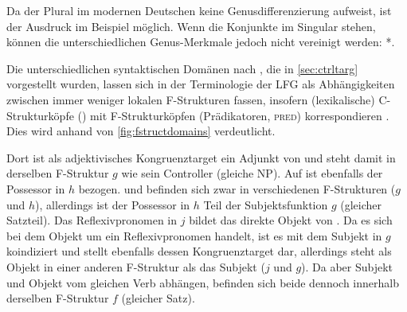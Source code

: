 Da der Plural im modernen Deutschen keine Genusdifferenzierung aufweist, ist
der Ausdruck im Beispiel möglich. Wenn die Konjunkte im Singular stehen, können
die unterschiedlichen Genus-Merkmale jedoch nicht vereinigt werden:
*.

Die unterschiedlichen syntaktischen Domänen nach \citet[54]{corbett2006}, die
in \cref{sec:ctrltarg} vorgestellt wurden, lassen sich in der Terminologie der
LFG als Abhängigkeiten zwischen immer weniger lokalen F-Strukturen fassen,
insofern (lexikalische) C-Strukturköpfe () mit F-Strukturköpfen
(Prädikatoren, \textsc{pred}) korrespondieren \autocite[117]{bresnanetal2016}.
Dies wird anhand von \cref{fig:fstructdomains} verdeutlicht.

Dort ist  als adjektivisches Kongruenztarget ein Adjunkt von
 und steht damit in derselben F-Struktur $g$ wie sein Controller
(gleiche NP). Auf  ist ebenfalls der Possessor  in $h$
bezogen.  und  befinden sich zwar in verschiedenen
F-Strukturen ($g$ und $h$), allerdings ist der Possessor in $h$ Teil der
Subjektsfunktion $g$ (gleicher Satzteil). Das Reflexivpronomen  in $j$
bildet das direkte Objekt von . Da es sich bei dem Objekt um ein
Reflexivpronomen handelt, ist es mit dem Subjekt in $g$ koindiziert und stellt
ebenfalls dessen Kongruenztarget dar, allerdings steht  als Objekt in
einer anderen F-Struktur als das Subjekt ($j$ und $g$). Da aber Subjekt und
Objekt vom gleichen Verb  abhängen, befinden sich beide dennoch
innerhalb derselben F-Struktur $f$ (gleicher Satz).

